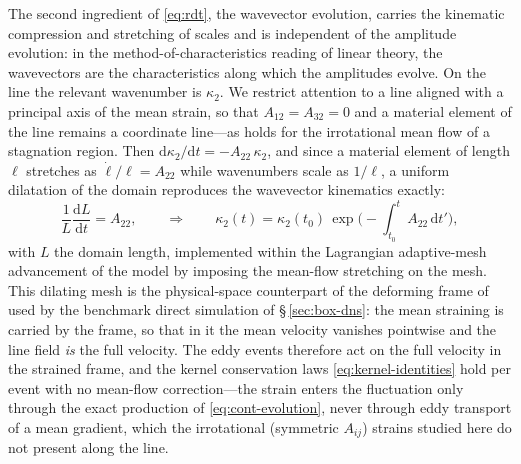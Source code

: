 \documentclass[lineno]{JFM-FLM_Au}
\begin{document}
The second ingredient of \eqref{eq:rdt}, the wavevector evolution, carries
the kinematic compression and stretching of scales and is independent of
the amplitude evolution: in the method-of-characteristics reading of
linear theory, the wavevectors are the characteristics along which the
amplitudes evolve. On the line the relevant wavenumber is $\kappa_2$. We
restrict attention to a line aligned with a principal axis of the mean
strain, so that $A_{12}=A_{32}=0$ and a material element of the line
remains a coordinate line---as holds for the irrotational mean flow of a
stagnation region. Then
$\mathrm{d}\kappa_2/\mathrm{d}t=-A_{22}\,\kappa_2$, and since a material
element of length $\ell$ stretches as $\dot\ell/\ell=A_{22}$ while
wavenumbers scale as $1/\ell$, a uniform dilatation of the domain
reproduces the wavevector kinematics exactly:
\begin{equation}
  \frac{1}{L}\frac{\mathrm{d}L}{\mathrm{d}t}=A_{22},
  \qquad\Longrightarrow\qquad
  \kappa_2(t)=\kappa_2(t_0)\,
  \exp\!\Big(\!-\!\int_{t_0}^{t}A_{22}\,\mathrm{d}t'\Big),
  \label{eq:dilatation}
\end{equation}
with $L$ the domain length, implemented within the Lagrangian
adaptive-mesh advancement of the model \citep{Lignell2013} by imposing
the mean-flow stretching on the mesh. This dilating mesh is the
physical-space counterpart of the deforming frame of
\citet{Rogallo1981} used by the benchmark direct simulation of
\S\,\ref{sec:box-dns}: the mean straining is carried by the frame, so
that in it the mean velocity vanishes pointwise and the line field
\emph{is} the full velocity. The eddy events therefore act on the full
velocity in the strained frame, and the kernel conservation laws
\eqref{eq:kernel-identities} hold per event with no mean-flow
correction---the strain enters the fluctuation only through the exact
production of \eqref{eq:cont-evolution}, never through eddy transport of
a mean gradient, which the irrotational (symmetric $A_{ij}$) strains
studied here do not present along the line.
\end{document}
